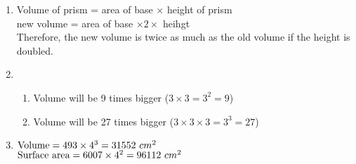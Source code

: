  \begin{solutions}{}{
\begin{enumerate}[itemsep=5pt, label=\textbf{\arabic*}. ] 
\item Volume of prism = area of base $\times$ height of prism \\
new volume = area of base $\times 2 \times$ heihgt \\
Therefore, the new volume is twice as much as the old volume if the height is doubled. 
\item \begin{enumerate}[itemsep=5pt, label=\textbf{\alph*}.]
       \item Volume will be 9 times bigger ($3 \times 3 = 3^{2} = 9$)
\item Volume will be 27 times bigger ($3 \times 3 \times 3 = 3^{3} = 27$)
      \end{enumerate}
\item $\text{Volume} = 493 \times 4^{3} \\
= 31552 ~cm^{2}$ \\
$\text{Surface area} = 6007 \times 4^{2} \\
= 96112 ~cm^{2}$
\end{enumerate}}
\end{solutions}


